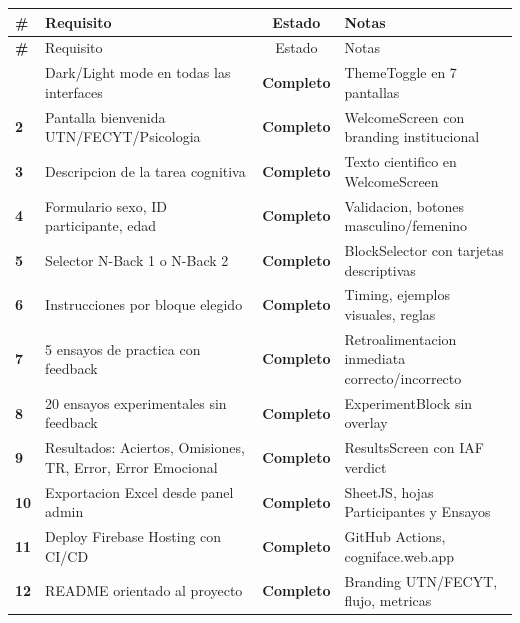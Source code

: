 \documentclass[12pt,a4paper]{article}
\begin{document}
\begin{longtable}{>{\bfseries\small}p{0.5cm} p{6.2cm} c p{4.5cm}}
\toprule
\# & Requisito & Estado & Notas \\
\midrule
\endfirsthead
\toprule
\# & Requisito & Estado & Notas \\
\midrule
\endhead
\bottomrule
\endfoot
1 & Dark/Light mode en todas las interfaces
  & \textcolor{success}{\bfseries Completo}
  & ThemeToggle en 7 pantallas \\

2 & Pantalla bienvenida UTN/FECYT/Psicologia
  & \textcolor{success}{\bfseries Completo}
  & WelcomeScreen con branding institucional \\

3 & Descripcion de la tarea cognitiva
  & \textcolor{success}{\bfseries Completo}
  & Texto cientifico en WelcomeScreen \\

4 & Formulario sexo, ID participante, edad
  & \textcolor{success}{\bfseries Completo}
  & Validacion, botones masculino/femenino \\

5 & Selector N-Back 1 o N-Back 2
  & \textcolor{success}{\bfseries Completo}
  & BlockSelector con tarjetas descriptivas \\

6 & Instrucciones por bloque elegido
  & \textcolor{success}{\bfseries Completo}
  & Timing, ejemplos visuales, reglas \\

7 & 5 ensayos de practica con feedback
  & \textcolor{success}{\bfseries Completo}
  & Retroalimentacion inmediata correcto/incorrecto \\

8 & 20 ensayos experimentales sin feedback
  & \textcolor{success}{\bfseries Completo}
  & ExperimentBlock sin overlay \\

9 & Resultados: Aciertos, Omisiones, TR, Error, Error Emocional
  & \textcolor{success}{\bfseries Completo}
  & ResultsScreen con IAF verdict \\

10 & Exportacion Excel desde panel admin
  & \textcolor{success}{\bfseries Completo}
  & SheetJS, hojas Participantes y Ensayos \\

11 & Deploy Firebase Hosting con CI/CD
  & \textcolor{success}{\bfseries Completo}
  & GitHub Actions, cogniface.web.app \\

12 & README orientado al proyecto
  & \textcolor{success}{\bfseries Completo}
  & Branding UTN/FECYT, flujo, metricas \\
\end{longtable}
\end{document}
